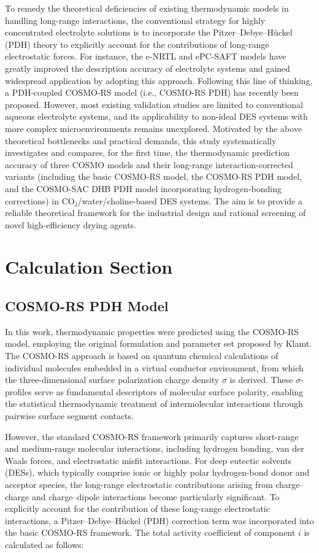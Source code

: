 \documentclass[AMA,LATO2COL]{WileyNJDv5} %
\begin{document}
To remedy the theoretical deficiencies of existing thermodynamic models in handling long-range interactions, the conventional strategy for highly concentrated electrolyte solutions is to incorporate the Pitzer–Debye–Hückel (PDH) theory to explicitly account for the contributions of long-range electrostatic forces. For instance, the e-NRTL and ePC-SAFT models have greatly improved the description accuracy of electrolyte systems and gained widespread application by adopting this approach. Following this line of thinking, a PDH-coupled COSMO-RS model (i.e., COSMO-RS PDH) has recently been proposed. However, most existing validation studies are limited to conventional aqueous electrolyte systems, and its applicability to non-ideal DES systems with more complex microenvironments remains unexplored. Motivated by the above theoretical bottlenecks and practical demands, this study systematically investigates and compares, for the first time, the thermodynamic prediction accuracy of three COSMO models and their long-range interaction-corrected variants (including the basic COSMO-RS model, the COSMO-RS PDH model, and the COSMO-SAC DHB PDH model incorporating hydrogen-bonding corrections) in CO₂/water/choline-based DES systems. The aim is to provide a reliable theoretical framework for the industrial design and rational screening of novel high-efficiency drying agents.

\section{Calculation Section}

\subsection{COSMO-RS PDH Model}

In this work, thermodynamic properties were predicted using the COSMO-RS model, employing the original formulation and parameter set proposed by Klamt. The COSMO-RS approach is based on quantum chemical calculations of individual molecules embedded in a virtual conductor environment, from which the three-dimensional surface polarization charge density $\sigma$ is derived. These $\sigma$-profiles serve as fundamental descriptors of molecular surface polarity, enabling the statistical thermodynamic treatment of intermolecular interactions through pairwise surface segment contacts.

However, the standard COSMO-RS framework primarily captures short-range and medium-range molecular interactions, including hydrogen bonding, van der Waals forces, and electrostatic misfit interactions. For deep eutectic solvents (DESs), which typically comprise ionic or highly polar hydrogen-bond donor and acceptor species, the long-range electrostatic contributions arising from charge--charge and charge--dipole interactions become particularly significant. To explicitly account for the contribution of these long-range electrostatic interactions, a Pitzer--Debye--H\"{u}ckel (PDH) correction term was incorporated into the basic COSMO-RS framework. The total activity coefficient of component \(i\) is calculated as follows:
\end{document}
